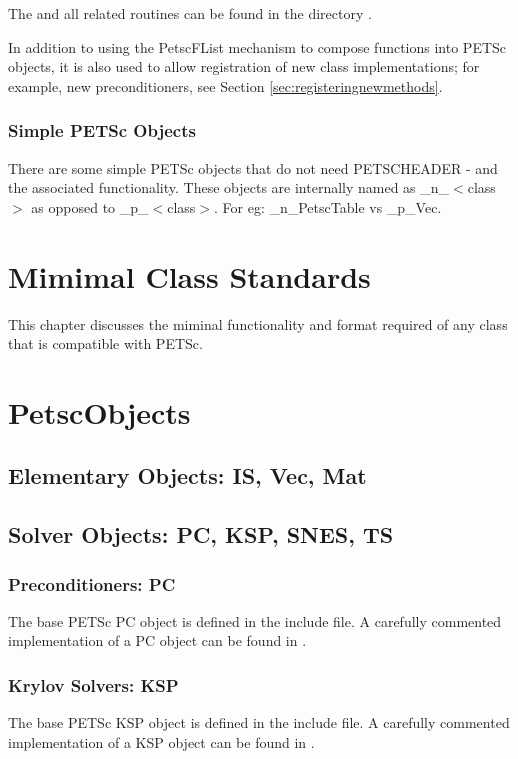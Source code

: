 \documentclass[twoside,12pt]{../sty/report_petsc}
\begin{document}
The  and all related routines can be found in the directory
.

In addition to using the PetscFList mechanism to compose functions into PETSc objects, it is
also used to allow registration of new class implementations; for example, new
preconditioners, see Section \ref{sec:registeringnewmethods}.

\subsection{Simple PETSc Objects}

There are some simple PETSc objects that do not need PETSCHEADER - and
the associated functionality. These objects are internally named as
\_n\_$<$class$>$ as opposed to \_p\_$<$class$>$. For eg: \_n\_PetscTable
vs \_p\_Vec.

\chapter{Mimimal Class Standards}
This chapter discusses the miminal functionality and format required of any 
class that is compatible with PETSc. 

\chapter{PetscObjects}

\section{Elementary Objects: IS, Vec, Mat}

\section{Solver Objects: PC, KSP, SNES, TS}

\subsection{Preconditioners: PC}

The base PETSc PC object is defined in the  include file. 
A carefully commented implementation of a PC object can be found in 
. 


\subsection{Krylov Solvers: KSP}
The base PETSc KSP object is defined in the  include file. 
A carefully commented implementation of a KSP object can be found in 
. 
\end{document}
